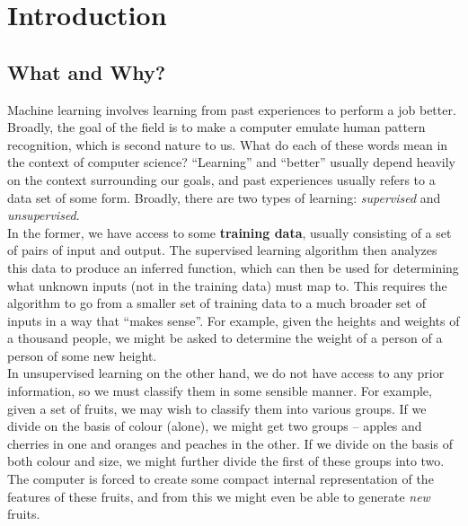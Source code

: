 \documentclass{article}
\begin{document}
\thispagestyle{empty}

\titleBC
\tableofcontents
\clearpage


% 
% 

\section{Introduction}

	\subsection{What and Why?}

		Machine learning involves learning from past experiences to perform a job better.\\
		Broadly, the goal of the field is to make a computer emulate human pattern recognition, which is second nature to us.
		What do each of these words mean in the context of computer science? ``Learning'' and ``better'' usually depend heavily on the context surrounding our goals, and past experiences usually refers to a data set of some form. Broadly, there are two types of learning: \emph{supervised} and \emph{unsupervised}.\\

		In the former, we have access to some \textbf{training data}, usually consisting of a set of pairs of input and output. The supervised learning algorithm then analyzes this data to produce an inferred function, which can then be used for determining what unknown inputs (not in the training data) must map to. This requires the algorithm to go from a smaller set of training data to a much broader set of inputs in a way that ``makes sense''. For example, given the heights and weights of a thousand people, we might be asked to determine the weight of a person of a person of some new height.\\
		In unsupervised learning on the other hand, we do not have access to any prior information, so we must classify them in some sensible manner. For example, given a set of fruits, we may wish to classify them into various groups. If we divide on the basis of colour (alone), we might get two groups -- apples and cherries in one and oranges and peaches in the other. If we divide on the basis of both colour and size, we might further divide the first of these groups into two. The computer is forced to create some compact internal representation of the features of these fruits, and from this we might even be able to generate \emph{new} fruits.\\
\end{document}
